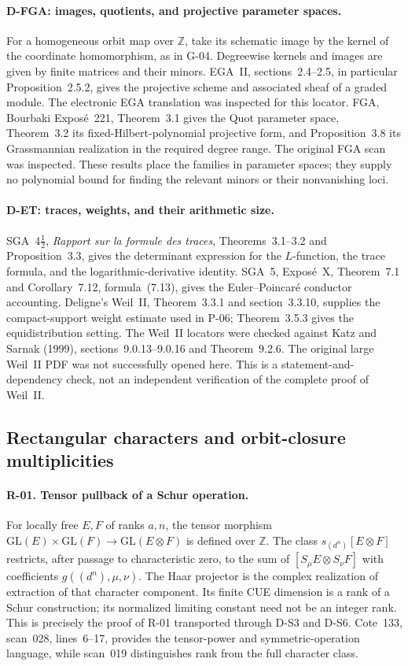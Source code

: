 \paragraph{D-FGA: images, quotients, and projective parameter spaces.}
For a homogeneous orbit map over $\mathbb Z$, take its schematic image by the kernel of the coordinate homomorphism, as in G-04. Degreewise kernels and images are given by finite matrices and their minors. EGA~II, sections~2.4--2.5, in particular Proposition~2.5.2, gives the projective scheme and associated sheaf of a graded module. The electronic EGA translation was inspected for this locator. FGA, Bourbaki Expos\'e~221, Theorem~3.1 gives the Quot parameter space, Theorem~3.2 its fixed-Hilbert-polynomial projective form, and Proposition~3.8 its Grassmannian realization in the required degree range. The original FGA scan was inspected. These results place the families in parameter spaces; they supply no polynomial bound for finding the relevant minors or their nonvanishing loci.

\paragraph{D-ET: traces, weights, and their arithmetic size.}
SGA~4$\frac12$, \emph{Rapport sur la formule des traces}, Theorems~3.1--3.2 and Proposition~3.3, gives the determinant expression for the $L$-function, the trace formula, and the logarithmic-derivative identity. SGA~5, Expos\'e~X, Theorem~7.1 and Corollary~7.12, formula~(7.13), gives the Euler--Poincar\'e conductor accounting. Deligne's Weil~II, Theorem~3.3.1 and section~3.3.10, supplies the compact-support weight estimate used in P-06; Theorem~3.5.3 gives the equidistribution setting. The Weil~II locators were checked against Katz and Sarnak (1999), sections~9.0.13--9.0.16 and Theorem~9.2.6. The original large Weil~II PDF was not successfully opened here. This is a statement-and-dependency check, not an independent verification of the complete proof of Weil~II.

\subsection{Rectangular characters and orbit-closure multiplicities}

\paragraph{R-01. Tensor pullback of a Schur operation.}
For locally free $E,F$ of ranks $a,n$, the tensor morphism $\mathrm{GL}(E)\times\mathrm{GL}(F)\to\mathrm{GL}(E\otimes F)$ is defined over $\mathbb Z$. The class $s_{(d^n)}[E\otimes F]$ restricts, after passage to characteristic zero, to the sum of $[S_\mu E\otimes S_\nu F]$ with coefficients $g((d^n),\mu,\nu)$. The Haar projector is the complex realization of extraction of that character component. Its finite CUE dimension is a rank of a Schur construction; its normalized limiting constant need not be an integer rank. This is precisely the proof of R-01 transported through D-S3 and D-S6. Cote~133, scan~028, lines~6--17, provides the tensor-power and symmetric-operation language, while scan~019 distinguishes rank from the full character class.


